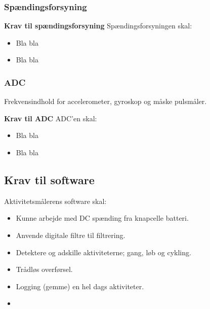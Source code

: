\subsubsection{Spændingsforsyning}

\textbf{Krav til spændingsforsyning} \newline
Spændingsforsyningen skal:
\begin{itemize}
\item Bla bla
\item Bla bla
\end{itemize}



\subsubsection{ADC}
Frekvensindhold for accelerometer, gyroskop og måske pulsmåler.


\textbf{Krav til ADC} \newline
ADC'en skal:
\begin{itemize}
\item Bla bla
\item Bla bla
\end{itemize}



\subsection{Krav til software}
Aktivitetsmålerens software skal:
\begin{itemize}
\item Kunne arbejde med DC spænding fra knapcelle batteri.
\item Anvende digitale filtre til filtrering.
\item Detektere og adskille aktiviteterne; gang, løb og cykling. 
\item Trådløs overførsel.
\item Logging (gemme) en hel dags aktiviteter. 
\item 
\end{itemize}
 


